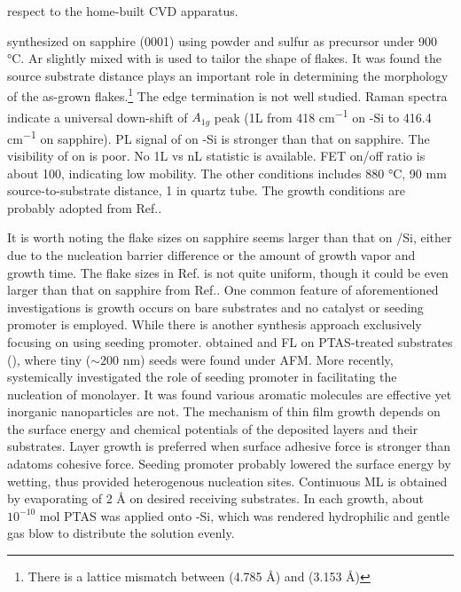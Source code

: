 respect to the home-built CVD apparatus.

\citeauthor{Zhang2013h} synthesized  on sapphire (0001) using  powder and sulfur as precursor under 900 \si{\degreeCelsius}.\cite{Zhang2013h} Ar slightly mixed with  is used to tailor the shape of  flakes. It was found the source substrate distance plays an important role in determining the morphology of the as-grown flakes.\footnote{There is a lattice mismatch between  (4.785 \AA) and  (3.153 \AA)} The edge termination is not well studied. Raman spectra indicate a universal down-shift of $A_{1g}$ peak (1L from 418 \si{cm^{-1}} on -Si to 416.4 \si{cm^{-1}} on sapphire). PL signal of  on -Si is stronger than that on sapphire. The visibility of  on  is poor. No 1L vs nL statistic is available. FET on/off ratio is about 100, indicating low mobility. The other conditions includes 880 \si{\degreeCelsius}, 90 mm source-to-substrate distance, 1 in quartz tube. The growth conditions are probably adopted from Ref.\cite{Huanga2013}.

It is worth noting the flake sizes on sapphire\cite{Zhang2013h} seems larger than that on /Si\cite{Peimyoo2013}, either due to the nucleation barrier difference or the amount of growth vapor and growth time. The flake sizes in Ref.\cite{Cong2013} is not quite uniform, though it could be even larger than that on sapphire from Ref.\cite{Zhang2013h}. One common feature of aforementioned investigations is growth occurs on bare substrates and no catalyst or seeding promoter is employed. While there is another synthesis approach\cite{Lee2013,Ling2014} exclusively focusing on using seeding promoter. \citeauthor{Lee2013} obtained  and  FL on PTAS-treated substrates (), where tiny ($\sim 200$ nm) seeds were found under AFM. More recently, \citeauthor{Ling2014} systemically investigated the role of seeding promoter in facilitating the nucleation of  monolayer.\cite{Ling2014} It was found various aromatic molecules are effective yet inorganic nanoparticles are not. The mechanism of thin film growth depends on the surface energy and chemical potentials of the deposited layers and their substrates. Layer growth is preferred when surface adhesive force is stronger than adatoms cohesive force. Seeding promoter probably lowered the surface energy by wetting, thus provided heterogenous nucleation sites. Continuous  ML is obtained by evaporating  of 2 \si{\angstrom} on desired receiving substrates. In each growth, about $10^{-10}$ mol PTAS was applied onto -Si, which was rendered hydrophilic and gentle gas blow to distribute the solution evenly.

